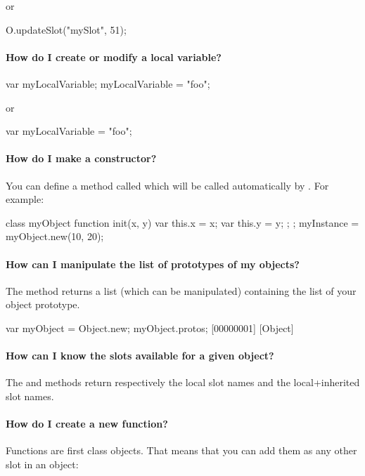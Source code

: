 \noindent
or

\begin{urbifixme}
O.updateSlot("mySlot", 51);
\end{urbifixme}

\paragraph{How do I create or modify a local variable?}
\begin{urbifixme}
var myLocalVariable;
myLocalVariable = "foo";
\end{urbifixme}

\noindent
or

\begin{urbifixme}
var myLocalVariable = "foo";
\end{urbifixme}


\paragraph{How do I make a constructor?}
You can define a method called  which will be called
automatically by . For example:

\begin{urbifixme}
class myObject {
  function init(x, y) {
    var this.x = x;
    var this.y = y;
  };
};
myInstance = myObject.new(10, 20);
\end{urbifixme}


\paragraph{How can I manipulate the list of prototypes of my objects?}
The  method returns a list (which can be manipulated)
containing the list of your object prototype.

\begin{urbifixme}
var myObject = Object.new;
myObject.protos;
[00000001] [Object]
\end{urbifixme}

\paragraph{How can I know the slots available for a given object?}
The  and  methods return
respectively the local slot names and the local+inherited slot names.

\paragraph{How do I create a new function?}
Functions are first class objects. That means that you can add them as
any other slot in an object:

